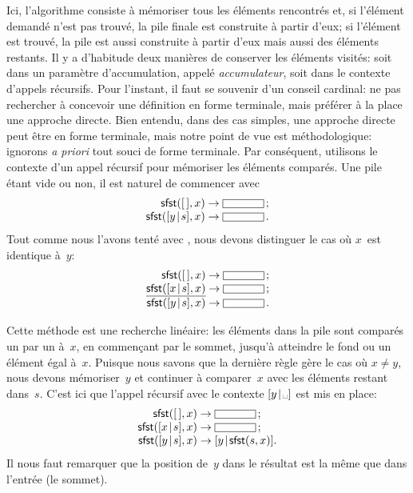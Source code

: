 Ici, l'algorithme consiste à mémoriser tous les éléments rencontrés
et, si l'élément demandé n'est pas trouvé, la pile finale est
construite à partir d'eux; si l'élément est trouvé, la pile est aussi
construite à partir d'eux mais aussi des éléments restants. Il y a
d'habitude deux manières de conserver les éléments visités: soit dans
un paramètre d'accumulation, appelé \emph{accumulateur}, soit dans le
contexte d'appels récursifs. Pour l'instant, il faut se souvenir d'un
conseil cardinal: ne pas rechercher à concevoir une définition en
forme terminale, mais préférer à la place une approche directe. Bien
entendu, dans des cas simples, une approche directe peut être en forme
terminale, mais notre point de vue est méthodologique: ignorons
\emph{a priori} tout souci de forme terminale. Par conséquent,
utilisons le contexte d'un appel récursif pour mémoriser les éléments
comparés. Une pile étant vide ou non, il est naturel de commencer avec
\begin{equation*}
\begin{array}{r@{\;}l@{\;}l}
\fun{sfst}(\el,x) & \rightarrow & \fbcode{CCCCC}\,;\\
\fun{sfst}(\cons{y}{s},x) & \rightarrow & \fbcode{CCCCC}\,.
\end{array}
\end{equation*}
Tout comme nous l'avons tenté avec , nous devons distinguer
le cas où \(x\)~est identique à~\(y\):
\begin{equation*}
\begin{array}{r@{\;}l@{\;}l}
\fun{sfst}(\el,x) & \rightarrow & \fbcode{CCCCC}\,;\\
\underline{\fun{sfst}(\cons{x}{s},x)} & \rightarrow & \fbcode{CCCCC}\,;\\
\fun{sfst}(\cons{y}{s},x) & \rightarrow & \fbcode{CCCCC}\,.
\end{array}
\end{equation*}

Cette méthode est une recherche linéaire:
les éléments dans la pile sont comparés un par un à~\(x\), en
commençant par le sommet, jusqu'à atteindre le fond ou un élément égal
à~\(x\). Puisque nous savons que la dernière règle gère le cas où \(x
\neq y\), nous devons mémoriser~\(y\) et continuer à comparer~\(x\)
avec les éléments restant dans~\(s\). C'est ici que l'appel récursif
avec le contexte \(\cons{y}{\text{\textvisiblespace}}\) est mis en
place:
\begin{equation*}
\begin{array}{r@{\;}l@{\;}l}
\fun{sfst}(\el,x) & \rightarrow & \fbcode{CCCCC}\,;\\
\fun{sfst}(\cons{x}{s},x) & \rightarrow & \fbcode{CCCCC}\,;\\
\fun{sfst}(\cons{y}{s},x) & \rightarrow & \cons{y}{\fun{sfst}(s,x)}.
\end{array}
\end{equation*}
Il nous faut remarquer que la position de~\(y\) dans le résultat est
la même que dans l'entrée (le sommet).

